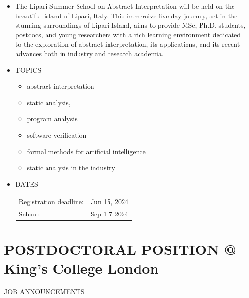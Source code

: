 \documentclass[prodmode,acmtecs]{acmsmall} %
\begin{document}
\begin{itemize}\item  The Lipari Summer School on Abstract Interpretation will be held on the beautiful island of Lipari, Italy. This immersive five-day journey, set in the stunning surroundings of Lipari Island, aims to provide MSc, Ph.D. students, postdocs, and young researchers with a rich learning environment dedicated to the exploration of abstract interpretation, its applications, and its recent advances both in industry and research academia. 
 
\item  TOPICS 
 
\begin{itemize}\item  abstract interpretation
\item  static analysis,
\item  program analysis
\item  software verification
\item  formal methods for artificial intelligence
\item  static analysis in the industry
\end{itemize} 
\item  DATES 
 
\begin{tabulary}{\linewidth}{LL}Registration deadline:  & Jun 15, 2024 \\
School:  & Sep 1-7 2024 \\
\end{tabulary}
 
\end{itemize}\section{POSTDOCTORAL POSITION @ King's College London}\label{POSTDOCTORALPOSITIONKingsCollegeLondon}JOB ANNOUNCEMENTS 
\end{document}
